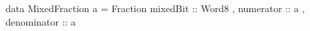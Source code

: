\begin{code}
data MixedFraction a = Fraction
  { mixedBit    :: Word8
  , numerator   :: a
  , denominator :: a
  }
\end{code}

